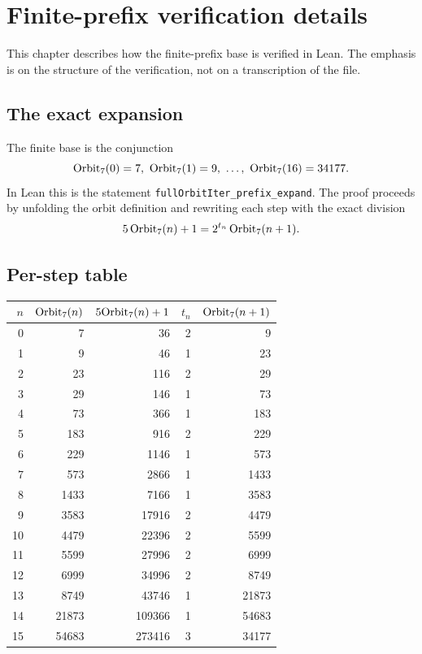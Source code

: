 \section{Finite-prefix verification details}

This chapter describes how the finite-prefix base is verified in
Lean.  The emphasis is on the structure of the verification, not on a
transcription of the file.

\subsection{The exact expansion}

The finite base is the conjunction
\begin{equation*}
  \Orbit_7(0)=7,\ \Orbit_7(1)=9,\ \dots,\ \Orbit_7(16)=34177.
\end{equation*}
In Lean this is the statement
\texttt{fullOrbitIter\_\allowbreak prefix\_\allowbreak expand}.  The
proof proceeds by unfolding the orbit definition and rewriting each
step with the exact division
\begin{equation*}
  5\,\mathrm{Orbit}_7(n)+1=2^{t_n}\,\mathrm{Orbit}_7(n+1).
\end{equation*}

\subsection{Per-step table}

\begin{center}
\scriptsize
\begin{tabular}{@{}rrrrr@{}}
\toprule
$n$ & $\mathrm{Orbit}_7(n)$ & $5\mathrm{Orbit}_7(n)+1$ & $t_n$ & $\mathrm{Orbit}_7(n+1)$ \\
\midrule
0 & 7 & 36 & 2 & 9 \\
1 & 9 & 46 & 1 & 23 \\
2 & 23 & 116 & 2 & 29 \\
3 & 29 & 146 & 1 & 73 \\
4 & 73 & 366 & 1 & 183 \\
5 & 183 & 916 & 2 & 229 \\
6 & 229 & 1146 & 1 & 573 \\
7 & 573 & 2866 & 1 & 1433 \\
8 & 1433 & 7166 & 1 & 3583 \\
9 & 3583 & 17916 & 2 & 4479 \\
10 & 4479 & 22396 & 2 & 5599 \\
11 & 5599 & 27996 & 2 & 6999 \\
12 & 6999 & 34996 & 2 & 8749 \\
13 & 8749 & 43746 & 1 & 21873 \\
14 & 21873 & 109366 & 1 & 54683 \\
15 & 54683 & 273416 & 3 & 34177 \\
\bottomrule
\end{tabular}
\end{center}

